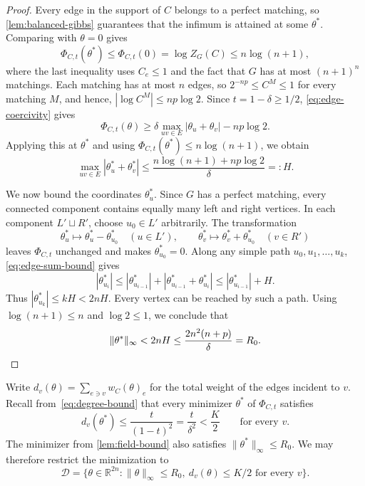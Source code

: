 \documentclass[11pt,reqno,letterpaper]{amsart}
\numberwithin{equation}{section}
\theoremstyle{definition}
\theoremstyle{remark}
\newcommand{\R}{\mathbb R}
\newcommand{\norm}[1]{\lVert #1\rVert}
\begin{document}
\begin{proof}
Every edge in the support of $C$ belongs to a perfect matching,
so \cref{lem:balanced-gibbs} guarantees that the infimum is attained
at some $\theta^*$.
Comparing with $\theta=0$ gives
\[
 \Phi_{C,t}(\theta^*)\le\Phi_{C,t}(0)
 =\log Z_G(C)\le n\log(n+1),
\]
where the last inequality uses $C_e\le1$ and the fact that
$G$ has at most $(n+1)^n$ matchings.
Each matching has at most $n$ edges, so
$2^{-np}\le C^M\le1$ for every matching $M$, and hence,
$|\log C^M|\le np\log2$.
Since $t=1-\delta\ge1/2$, \cref{eq:edge-coercivity} gives
\[
 \Phi_{C,t}(\theta)
 \ge \delta\max_{uv\in E}|\theta_u+\theta_v|-np\log2.
\]
Applying this at $\theta^*$ and using
$\Phi_{C,t}(\theta^*)\le n\log(n+1)$, we obtain
\begin{equation}\label{eq:edge-sum-bound}
 \max_{uv\in E}|\theta_u^*+\theta_v^*|
 \le\frac{n\log(n+1)+np\log2}{\delta}=:H.
\end{equation}

We now bound the coordinates $\theta^*_u$.
Since $G$ has a perfect matching, every connected component
contains equally many left and right vertices.
In each component $L'\sqcup R'$, choose $u_0\in L'$ arbitrarily.
The transformation
\[
 \theta_u^*\mapsto\theta_u^*-\theta^*_{u_0} \quad(u\in L'),
 \qquad
 \theta_v^*\mapsto\theta_v^*+\theta^*_{u_0} \quad(v\in R')
\]
leaves $\Phi_{C,t}$ unchanged and makes $\theta^*_{u_0}=0$.
Along any simple path $u_0,u_1,\ldots,u_k$,
\cref{eq:edge-sum-bound} gives
\[
 |\theta^*_{u_i}|
 \le |\theta^*_{u_{i-1}}|
    +|\theta^*_{u_{i-1}}+\theta^*_{u_i}|
 \le |\theta^*_{u_{i-1}}|+H.
\]
Thus $|\theta^*_{u_k}|\le kH<2nH$.
Every vertex can be reached by such a path.
Using $\log(n+1)\le n$ and $\log2\le1$, we conclude that
\[
 \norm{\theta^*}_\infty<2nH
 \le\frac{2n^2(n+p)}{\delta}=R_0. \qedhere
\]
\end{proof}

Write $d_v(\theta)=\sum_{e\ni v}w_C(\theta)_e$ for the total
weight of the edges incident to $v$.
Recall from~\cref{eq:degree-bound} that every minimizer
$\theta^*$ of $\Phi_{C,t}$ satisfies
\[
 d_v(\theta^*)\le\frac{t}{(1-t)^2}
 =\frac{t}{\delta^2}<\frac K2
 \qquad\text{for every }v.
\]
The minimizer from \cref{lem:field-bound} also satisfies
$\norm{\theta^*}_\infty\le R_0$.
We may therefore restrict the minimization to
\begin{equation*}
 \mathcal{D}=\{\theta\in\R^{2n}:\norm{\theta}_\infty\le R_0,\ 
                  d_v(\theta)\le K/2\text{ for every }v\}.
\end{equation*}
\end{document}

